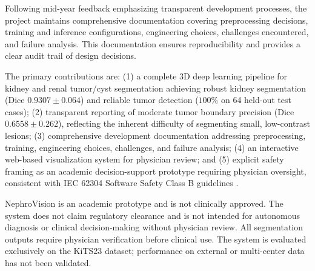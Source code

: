 Following mid-year feedback emphasizing transparent development processes, the project maintains comprehensive documentation covering preprocessing decisions, training and inference configurations, engineering choices, challenges encountered, and failure analysis. This documentation ensures reproducibility and provides a clear audit trail of design decisions.

The primary contributions are: (1) a complete 3D deep learning pipeline for kidney and renal tumor/cyst segmentation achieving robust kidney segmentation (Dice $0.9307 \pm 0.064$) and reliable tumor detection ($100\%$ on 64 held-out test cases); (2) transparent reporting of moderate tumor boundary precision (Dice $0.6558 \pm 0.262$), reflecting the inherent difficulty of segmenting small, low-contrast lesions; (3) comprehensive development documentation addressing preprocessing, training, engineering choices, challenges, and failure analysis; (4) an interactive web-based visualization system for physician review; and (5) explicit safety framing as an academic decision-support prototype requiring physician oversight, consistent with IEC 62304 Software Safety Class B guidelines \cite{iec62304}.

NephroVision is an academic prototype and is not clinically approved. The system does not claim regulatory clearance and is not intended for autonomous diagnosis or clinical decision-making without physician review. All segmentation outputs require physician verification before clinical use. The system is evaluated exclusively on the KiTS23 dataset; performance on external or multi-center data has not been validated.

